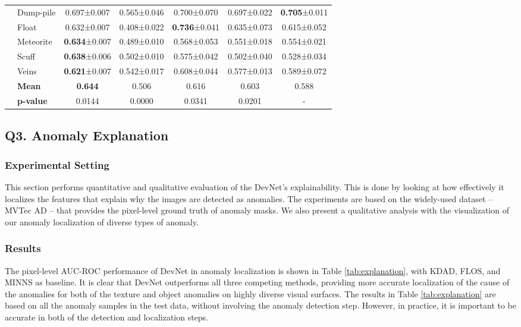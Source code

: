 \documentclass[10pt,journal,compsoc]{IEEEtran}
\begin{document}
\begin{table}[bt]
{\begin{tabular}{l@{}l@{}ccccc}
          & Dump-pile & 0.697±0.007 & 0.565±0.046 & 0.700±0.070 & 0.697±0.022 & \textbf{0.705}±0.011 \\
          & Float & 0.632±0.007 & 0.408±0.022 & \textbf{0.736}±0.041 & 0.635±0.073 & 0.615±0.052 \\
          & Meteorite & \textbf{0.634}±0.007 & 0.489±0.010 & 0.568±0.053 & 0.551±0.018 & 0.554±0.021 \\
          & Scuff & \textbf{0.638}±0.006 & 0.502±0.010 & 0.575±0.042 & 0.502±0.040 & 0.528±0.034 \\
          & Veins & \textbf{0.621}±0.007 & 0.542±0.017 & 0.608±0.044 & 0.577±0.013 & 0.589±0.072 \\\cline{2-7}
          & \textbf{Mean}  & \textbf{0.644} & 0.506 & 0.616 & 0.603 & 0.588 \\
    \hline
    & \textbf{p-value} & 0.0144 & 0.0000 & 0.0341 & 0.0201 & - \\\hline
    \end{tabular}}
  \label{tab:openset}\end{table}


\subsection{Q3. Anomaly Explanation}\label{subsec:explanation}

\subsubsection{Experimental Setting}
This section performs quantitative and qualitative evaluation of the DevNet's explainability. This is done by looking at how effectively it localizes the features that explain why the images are detected as anomalies. The experiments are based on the widely-used dataset -- MVTec AD -- that provides the pixel-level ground truth of anomaly masks. We also present a qualitative analysis with the visualization of our anomaly localization of diverse types of anomaly. 


 \subsubsection{Results}

The pixel-level AUC-ROC performance of DevNet in anomaly localization is shown in Table \ref{tab:explanation}, with KDAD, FLOS, and MINNS as baseline. It is clear that DevNet outperforms all three competing methods, providing more accurate localization of the cause of the anomalies for both of the texture and object anomalies on highly diverse visual surfaces. The results in Table \ref{tab:explanation} are based on all the anomaly samples in the test data, without involving the anomaly detection step. However, in practice, it is important to be accurate in both of the detection and localization steps. 
\end{document}
